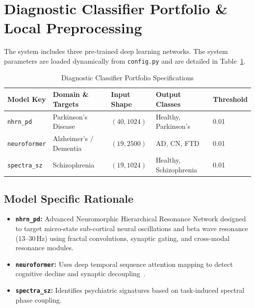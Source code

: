 \documentclass[runningheads]{llncs}
\begin{document}
\section{Diagnostic Classifier Portfolio \& Local Preprocessing}
The system includes three pre-trained deep learning networks. The system parameters are loaded dynamically from \texttt{config.py} and are detailed in Table~\ref{tab:classifiers}.

\begin{table}[t]
\centering
\caption{Diagnostic Classifier Portfolio Specifications}
\label{tab:classifiers}
\begin{tabular}{@{}lllll@{}}
\toprule
\textbf{Model Key} & \textbf{Domain \& Targets} & \textbf{Input Shape} & \textbf{Output Classes} & \textbf{Threshold} \\ \midrule
\texttt{nhrn\_pd} & Parkinson's Disease & $(40, 1024)$ & Healthy, Parkinson's & 0.01 \\
\texttt{neuroformer} & Alzheimer's / Dementia & $(19, 2500)$ & AD, CN, FTD & 0.01 \\
\texttt{spectra\_sz} & Schizophrenia & $(19, 1024)$ & Healthy, Schizophrenia & 0.01 \\ \bottomrule
\end{tabular}
\end{table}

\subsection{Model Specific Rationale}
\begin{itemize}
    \item \textbf{\texttt{nhrn\_pd}:} Advanced Neuromorphic Hierarchical Resonance Network designed to target micro-state sub-cortical neural oscillations and beta wave resonance ($13$--$30$\,Hz) using fractal convolutions, synaptic gating, and cross-modal resonance modules.
    \item \textbf{\texttt{neuroformer}:} Uses deep temporal sequence attention mapping to detect cognitive decline and synaptic decoupling~\cite{lalawat2023neuroformer}.
    \item \textbf{\texttt{spectra\_sz}:} Identifies psychiatric signatures based on task-induced spectral phase coupling.
\end{itemize}
\end{document}
